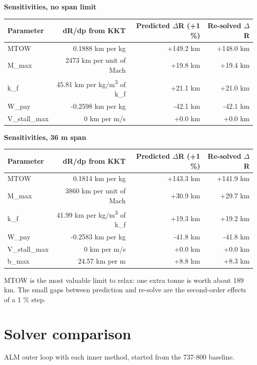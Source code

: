 \documentclass[10pt,a4paper]{article}
\begin{document}
\begin{table}[H]\centering\small
{\textbf{Sensitivities, no span limit}}\\[3pt]
\begin{tabular}{lrrr}
\toprule
\textbf{Parameter} & \textbf{dR/dp from KKT} & \textbf{Predicted $\Delta$R (+1 \%)} & \textbf{Re-solved $\Delta$R} \\
\midrule
MTOW & 0.1888 km per kg & +149.2 km & +148.0 km \\
M\_max & 2473 km per unit of Mach & +19.8 km & +19.4 km \\
k\_f & 45.81 km per kg/m\textsuperscript{3} of k\_f & +21.1 km & +21.0 km \\
W\_pay & -0.2598 km per kg & -42.1 km & -42.1 km \\
V\_stall\_max & 0 km per m/s & +0.0 km & +0.0 km \\
\bottomrule
\end{tabular}
\end{table}
\begin{table}[H]\centering\small
{\textbf{Sensitivities, 36 m span}}\\[3pt]
\begin{tabular}{lrrr}
\toprule
\textbf{Parameter} & \textbf{dR/dp from KKT} & \textbf{Predicted $\Delta$R (+1 \%)} & \textbf{Re-solved $\Delta$R} \\
\midrule
MTOW & 0.1814 km per kg & +143.3 km & +141.9 km \\
M\_max & 3860 km per unit of Mach & +30.9 km & +29.7 km \\
k\_f & 41.99 km per kg/m\textsuperscript{3} of k\_f & +19.3 km & +19.2 km \\
W\_pay & -0.2583 km per kg & -41.8 km & -41.8 km \\
V\_stall\_max & 0 km per m/s & +0.0 km & +0.0 km \\
b\_max & 24.57 km per m & +8.8 km & +8.3 km \\
\bottomrule
\end{tabular}
\end{table}
MTOW is the most valuable limit to relax: one extra tonne is worth about 189 km. The small gaps between prediction and re-solve are the second-order effects of a 1 \% step.

\section{Solver comparison}
ALM outer loop with each inner method, started from the 737-800 baseline.
\end{document}
